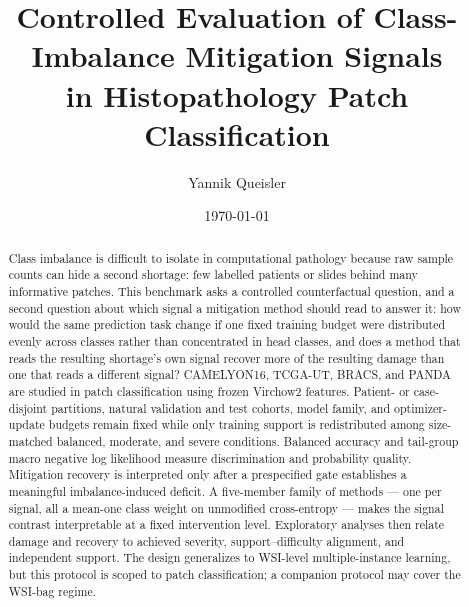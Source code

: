 \documentclass[11pt]{article}
\title{Controlled Evaluation of Class-Imbalance Mitigation Signals\\
in Histopathology Patch Classification}
\author{Yannik Queisler}
\date{\today}
\begin{document}
\raggedbottom
\hypersetup{pageanchor=false}
\begin{titlepage}
\centering
\vspace*{\fill}
\makeatletter
{\LARGE\bfseries \@title\par}
\vspace{1.5em}
{\large \@author\par}
\vspace{1.5em}
{\large \@date\par}
\makeatother

\begin{abstract}
\begingroup
\setlength{\emergencystretch}{2em}
\noindent Class imbalance is difficult to isolate in computational pathology because raw sample counts can hide a second shortage: few labelled patients or slides behind many informative patches. This benchmark asks a controlled counterfactual question, and a second question about which signal a mitigation method should read to answer it: how would the same prediction task change if one fixed training budget were distributed evenly across classes rather than concentrated in head classes, and does a method that reads the resulting shortage's own signal recover more of the resulting damage than one that reads a different signal? CAMELYON16, TCGA-UT, BRACS, and PANDA are studied in patch classification using frozen Virchow2 features. Patient- or case-disjoint partitions, natural validation and test cohorts, model family, and optimizer-update budgets remain fixed while only training support is redistributed among size-matched balanced, moderate, and severe conditions. Balanced accuracy and tail-group macro negative log likelihood measure discrimination and probability quality. Mitigation recovery is interpreted only after a prespecified gate establishes a meaningful imbalance-induced deficit. A five-member family of methods --- one per signal, all a mean-one class weight on unmodified cross-entropy --- makes the signal contrast interpretable at a fixed intervention level. Exploratory analyses then relate damage and recovery to achieved severity, support--difficulty alignment, and independent support. The design generalizes to WSI-level multiple-instance learning, but this protocol is scoped to patch classification; a companion protocol may cover the WSI-bag regime.
\par
\endgroup
\end{abstract}
\vspace*{\fill}
\end{titlepage}
\hypersetup{pageanchor=true}
\end{document}
